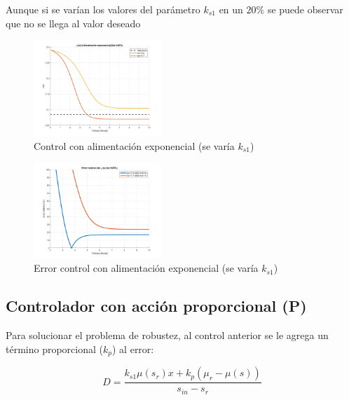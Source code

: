 \documentclass[letterpaper, 10 pt, conference]{ieeeconf}  %
\begin{document}
Aunque si se varían los valores del parámetro $k_{s1}$ en un $20\%$ se puede observar que no se llega al valor deseado

\begin{figure}[H]
  \centering
  \includegraphics[width=0.43\textwidth]{./Images_tp3/exp_ks1.png}
  \caption{Control con alimentación exponencial (se varía $k_{s1}$)}
\end{figure}
\begin{figure}[H]
  \centering
  \includegraphics[width=0.43\textwidth]{./Images_tp3/exp_err_ks1.png}
  \caption{Error control con alimentación exponencial (se varía $k_{s1}$)}
\end{figure}

\subsection{Controlador con acción proporcional (P)}  
Para solucionar el problema de robustez, al control anterior se le agrega un término proporcional (\(k_p\)) al error:

\begin{equation}
D = \frac{k_{s1}\mu(s_r)x+k_p(\mu_r-\mu(s))}{s_{in}-s_r}
\end{equation}
\end{document}
